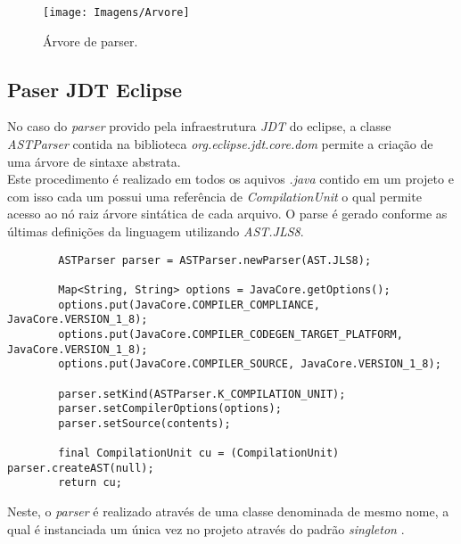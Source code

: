 	\begin{figure}[h]
		\center
		\texttt{[image: Imagens/Arvore]}
		\label{fig:TreeParser}
		\caption{Árvore de parser.}
	\end{figure}
	
	
	\subsection{Paser JDT Eclipse}
	No caso do \textit{parser} provido pela infraestrutura \textit{JDT} do eclipse,  a classe \textit{ASTParser} contida na biblioteca \textit{org.eclipse.jdt.core.dom} permite a criação de uma árvore de sintaxe abstrata.\\
	Este procedimento é realizado em todos os aquivos \textit{.java} contido em um projeto e com isso cada um possui uma referência de \textit{CompilationUnit} o qual permite acesso ao nó raiz árvore sintática de cada arquivo. O parse é gerado conforme as últimas definições da linguagem utilizando \textit{AST.JLS8}.\

	\begin{lstlisting}
		ASTParser parser = ASTParser.newParser(AST.JLS8);
		
		Map<String, String> options = JavaCore.getOptions();
		options.put(JavaCore.COMPILER_COMPLIANCE, JavaCore.VERSION_1_8);
		options.put(JavaCore.COMPILER_CODEGEN_TARGET_PLATFORM, JavaCore.VERSION_1_8);
		options.put(JavaCore.COMPILER_SOURCE, JavaCore.VERSION_1_8);
		
		parser.setKind(ASTParser.K_COMPILATION_UNIT);
		parser.setCompilerOptions(options);
		parser.setSource(contents);
		
		final CompilationUnit cu = (CompilationUnit) parser.createAST(null);
		return cu;
	\end{lstlisting}
	
	Neste, o \textit{parser} é realizado através de uma classe denominada de mesmo nome, a qual é instanciada um única vez no projeto através do padrão \textit{singleton} \cite{Gamma:1995}.
	

